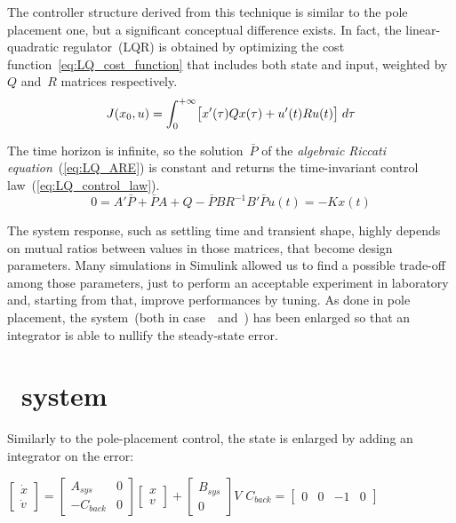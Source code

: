 
The controller structure derived from this technique is similar to the pole placement one, but a significant conceptual difference exists. In fact, the linear-quadratic regulator~(LQR) is obtained by optimizing the cost function~\ref{eq:LQ_cost_function} that includes both state and input, weighted by~$Q$ and~$R$ matrices respectively.
\begin{equation}
	J(x_0, u) = \int_{0}^{+\infty} \bigl{[} x'(\tau)Qx(\tau) + u'(t)Ru(t) \bigr{]} \; d\tau
	\label{eq:LQ_cost_function}
\end{equation}

The time horizon is infinite, so the solution~$\bar{P}$ of the \textit{algebraic Riccati equation}~(\cref{eq:LQ_ARE}) is constant and returns the time-invariant control law~(\ref{eq:LQ_control_law}).
\begin{subequations}
	\begin{equation}
		0 = A' \bar{P} + \bar{P} A + Q - \bar{P} B R^{-1} B' \bar{P}
		\label{eq:LQ_ARE}
	\end{equation}
	\begin{equation}
		u(t) = -K x(t)
		\label{eq:LQ_control_law}
	\end{equation}
\end{subequations}

The system response, such as settling time and transient shape, highly depends on mutual ratios between values in those matrices, that become design parameters. Many simulations in Simulink allowed us to find a possible trade-off among those parameters, just to perform an acceptable experiment in laboratory and, starting from that, improve performances by tuning.
As done in pole placement, the system~(both in case~\onedof\ and~\twodof) has been enlarged so that an integrator is able to nullify the steady-state error.

\section{\onedof\ system}

Similarly to the pole-placement control, the state is enlarged by adding an integrator on the error:
\begin{center}
	$\begin{bmatrix}
		\dot{x} \\
		\dot{v}
	\end{bmatrix}
	=
	\begin{bmatrix}
		A_{sys} & 0 \\
		-C_{back} & 0
	\end{bmatrix}
	\begin{bmatrix}
		x \\
		v
	\end{bmatrix}
	+
	\begin{bmatrix}
		B_{sys} \\
		0
	\end{bmatrix}
	V$		\qquad $ C_{back} =
	\begin{bmatrix}
		0 & 0 & -1 & 0
	\end{bmatrix}$
\end{center}


